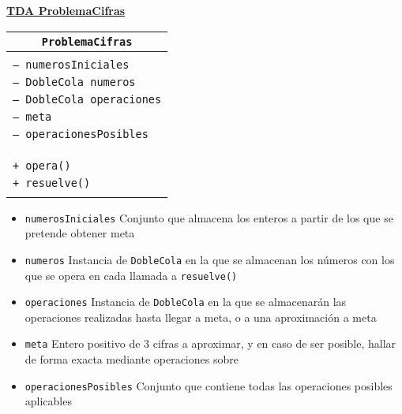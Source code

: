 \documentclass[a4paper,10pt]{scrartcl}
\newcommand{\objeto}[4]{\noindent\underline{\textbf{TDA #1}}
            \begin{center}\begin{tabular}{|p{7cm}|}
                 \hline
                 \multicolumn{1}{|c|}{\texttt{#1}}\\
                 \hline
                  \\#2\\\\
                 \hline
                 \\#3\\\\
                 \hline
            \end{tabular}\end{center}
            \begin{itemize}
            #4
            \end{itemize}
               }
\def\C++#1{\texttt{#1}}
\begin{document}
 \objeto{ProblemaCifras}{\C++{-- numerosIniciales}\\
                        \C++{-- DobleCola numeros}\\
                        \C++{-- DobleCola operaciones}\\
                        \C++{-- meta}\\
                        \C++{-- operacionesPosibles}\\
                        }
                        {\C++{+ opera()}\\
                        \C++{+ resuelve()}}{
  \item \C++{numerosIniciales} Conjunto que almacena los enteros
   a partir de los que se pretende obtener meta
  \item \C++{numeros} Instancia de \C++{DobleCola} en la que se
   almacenan los números con los que se opera en cada llamada
   a \C++{resuelve()}
  \item \C++{operaciones} Instancia de \C++{DobleCola} en la que
   se almacenarán las operaciones realizadas hasta llegar a meta,
   o a una aproximación a meta
  \item \C++{meta} Entero positivo de 3 cifras a aproximar, y en
   caso de ser posible, hallar de forma exacta mediante operaciones sobre
  \item \C++{operacionesPosibles} Conjunto que contiene todas las
   operaciones posibles aplicables}       
   
\end{document}
